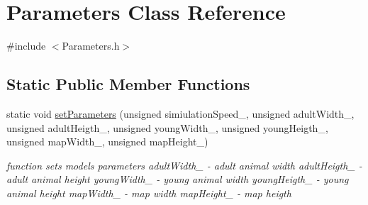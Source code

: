 \hypertarget{class_parameters}{}\section{Parameters Class Reference}
\label{class_parameters}


{\ttfamily \#include $<$Parameters.\+h$>$}

\subsection*{Static Public Member Functions}
\begin{DoxyCompactItemize}
\item 
static void \hyperlink{class_parameters_a6d84a2dc3c36144dc054a8516fce43cc}{set\+Parameters} (unsigned simiulation\+Speed\+\_\+, unsigned adult\+Width\+\_\+, unsigned adult\+Heigth\+\_\+, unsigned young\+Width\+\_\+, unsigned young\+Heigth\+\_\+, unsigned map\+Width\+\_\+, unsigned map\+Height\+\_\+)
\begin{DoxyCompactList}\small\item\em function sets model\textquotesingle{}s parameters  adult\+Width\+\_\+ -\/ adult animal width  adult\+Heigth\+\_\+ -\/ adult animal height  young\+Width\+\_\+ -\/ young animal width  young\+Heigth\+\_\+ -\/ young animal height  map\+Width\+\_\+ -\/ map width  map\+Height\+\_\+ -\/ map heigth \end{DoxyCompactList}\end{DoxyCompactItemize}
